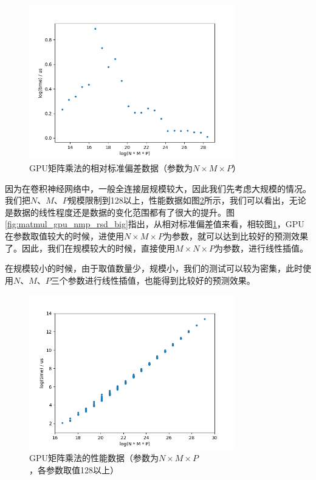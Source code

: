     \begin{figure}[!htbp]
        \centering
        \includegraphics[width=0.8\textwidth]{figures/matmul_gpu_nmp_rsd.png}
        \caption{GPU矩阵乘法的相对标准偏差数据（参数为$ N \times M \times P $）}
        \label{fig:matmul_gpu_nmp_rsd}
    \end{figure}
    
    因为在卷积神经网络中，一般全连接层规模较大，因此我们先考虑大规模的情况。我们把$ N $、$ M $、$ P $规模限制到128以上，性能数据如图\ref{fig:matmul_gpu_nmp_big}所示，我们可以看出，无论是数据的线性程度还是数据的变化范围都有了很大的提升。图\ref{fig:matmul_gpu_nmp_rsd_big}指出，从相对标准偏差值来看，相较图\ref{fig:matmul_gpu_nmp_rsd}，GPU在参数取值较大的时候，进使用$ N \times M \times P $为参数，就可以达到比较好的预测效果了。因此，我们在规模较大的时候，直接使用$ M \times N \times P $为参数，进行线性插值。
    
    在规模较小的时候，由于取值数量少，规模小，我们的测试可以较为密集，此时使用$ N $、$ M $、$ P $三个参数进行线性插值，也能得到比较好的预测效果。

    \begin{figure}[!htbp]
        \centering
        \includegraphics[width=0.8\textwidth]{figures/matmul_gpu_nmp_big.png}
        \caption{GPU矩阵乘法的性能数据（参数为$N \times M \times P $，各参数取值128以上）}
        \label{fig:matmul_gpu_nmp_big}
    \end{figure}

